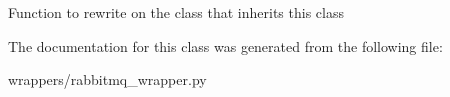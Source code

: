 \begin{DoxyVerb}Function to rewrite on the class that inherits this class
\end{DoxyVerb}
 

The documentation for this class was generated from the following file\+:\begin{DoxyCompactItemize}
\item 
wrappers/rabbitmq\+\_\+wrapper.\+py\end{DoxyCompactItemize}
